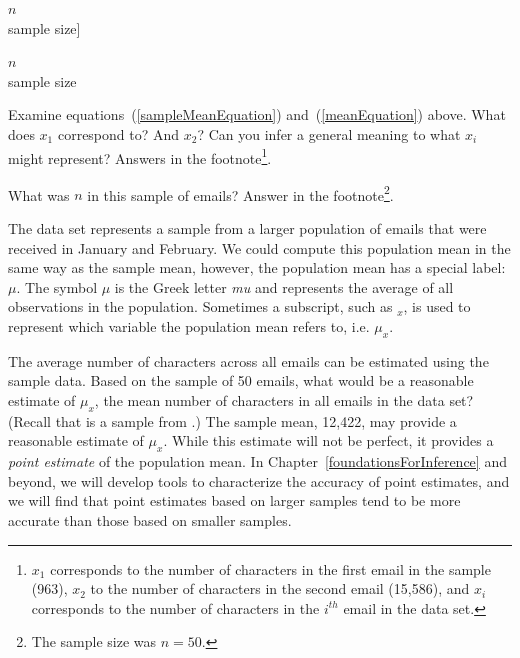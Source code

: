 $n$\\\footnotesize sample size]{\raggedright\vspace{-8mm}

$n$\\\footnotesize sample size}\vspace{-2mm}

\begin{exercise}
Examine equations~(\ref{sampleMeanEquation}) and~(\ref{meanEquation}) above. What does $x_1$ correspond to? And $x_2$? Can you infer a general meaning to what $x_i$ might represent? Answers in the footnote\footnote{$x_1$ corresponds to the number of characters in the first email in the sample (963), $x_2$ to the number of characters in the second email (15,586), and $x_i$ corresponds to the number of characters in the $i^{th}$ email in the data set.}.
\end{exercise}

\begin{exercise}
What was $n$ in this sample of emails? Answer in the footnote\footnote{The sample size was $n=50$.}.
\end{exercise}

The  data set represents a sample from a larger population of emails that were received in January and February. We could compute this population mean in the same way as the sample mean, however, the population mean has a special label: $\mu$.   The symbol $\mu$ is the Greek letter \emph{mu} and represents the average of all observations in the population. Sometimes a subscript, such as $_x$, is used to represent which variable the population mean refers to, i.e. $\mu_x$.

\begin{example}{The average number of characters across all emails can be estimated using the sample data. Based on the sample of 50 emails, what would be a reasonable estimate of $\mu_x$, the mean number of characters in all emails in the  data set? (Recall that  is a sample from .)}
The sample mean, 12,422, may provide a reasonable estimate of $\mu_x$. While this estimate will not be perfect, it provides a \emph{point estimate} of the population mean. In Chapter~\ref{foundationsForInference} and beyond, we will develop tools to characterize the accuracy of point estimates, and we will find that point estimates based on larger samples tend to be more accurate than those based on smaller samples.
\end{example}

